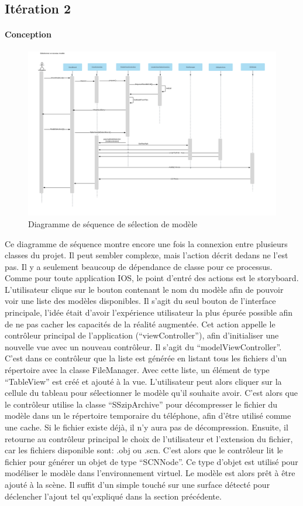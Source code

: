 \documentclass[rapport.tex]{subfiles}
\begin{document}
\subsection*{Itération 2}
\paragraph*{Conception}
\begin{figure}[H]
    \includegraphics[width=.8\textheight, angle=270]{DSS_SelectModels.png}
\centering
    \caption{Diagramme de séquence de sélection de modèle}
\end{figure}
Ce diagramme de séquence montre encore une fois la connexion entre plusieurs classes du projet. Il peut sembler complexe, mais l’action décrit dedans ne l’est pas. Il y a seulement beaucoup de dépendance de classe pour ce processus. Comme pour toute application IOS, le point d’entré des actions est le storyboard. L'utilisateur clique sur le bouton contenant le nom du modèle afin de pouvoir voir une liste des modèles disponibles. Il s’agit du seul bouton de l’interface principale, l’idée était d’avoir l’expérience utilisateur la plus épurée possible afin de ne pas cacher les capacités de la réalité augmentée. Cet action appelle le contrôleur principal de l’application (“viewController”), afin d’initialiser une nouvelle vue avec un nouveau contrôleur. Il s’agit du “modelViewController”. C’est dans ce contrôleur que la liste est générée en listant tous les fichiers d’un répertoire avec la classe FileManager. Avec cette liste, un élément de type “TableView” est créé et ajouté à la vue. L’utilisateur peut alors cliquer sur la cellule du tableau pour sélectionner le modèle qu’il souhaite avoir. C’est alors que le contrôleur utilise la classe “SSzipArchive” pour décompresser le fichier du modèle dans un le répertoire temporaire du téléphone, afin d’être utilisé comme une cache. Si le fichier existe déjà, il n’y aura pas de décompression. Ensuite, il retourne au contrôleur principal le choix de l’utilisateur et l’extension du fichier, car les fichiers disponible sont: .obj ou .scn. C’est alors que le contrôleur lit le fichier pour générer un objet de type “SCNNode”. Ce type d’objet est utilisé pour modéliser le modèle dans l’environnement virtuel. Le modèle est alors prêt à être ajouté à la scène. Il suffit d’un simple touché sur une surface détecté pour déclencher l’ajout tel qu’expliqué dans la section précédente.
\end{document}
